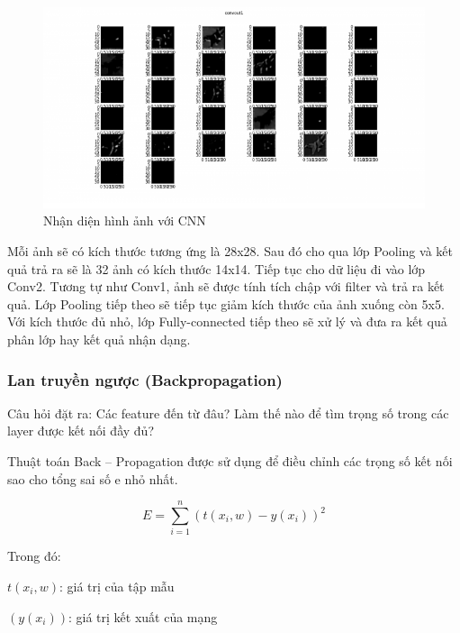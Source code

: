 \begin{center}
    \begin{figure}[h!]
    \begin{center}
     \includegraphics[scale=0.8]{img/basiccnn2.png}
    \end{center}
    \caption{Nhận diện hình ảnh với CNN \cite{ptha} }
    \label{refhinh9}
    \end{figure}
\end{center}

Mỗi ảnh sẽ có kích thước tương ứng là 28x28. Sau đó cho qua lớp Pooling và kết quả trả ra sẽ là 32 ảnh có kích thước 14x14. Tiếp tục cho dữ liệu đi vào lớp Conv2. Tương tự như Conv1, ảnh sẽ được tính tích chập với filter và trả ra kết quả. Lớp Pooling tiếp theo sẽ tiếp tục giảm kích thước của ảnh xuống còn 5x5. Với kích thước đủ nhỏ, lớp Fully-connected tiếp theo sẽ xử lý và đưa ra kết quả phân lớp hay kết quả nhận dạng.

\subsubsection{Lan truyền ngược (Backpropagation)}

Câu hỏi đặt ra: Các feature đến từ đâu? Làm thế nào để tìm trọng số trong các layer được kết nối đầy đủ?

Thuật toán Back – Propagation được sử dụng để điều chỉnh các trọng số kết nối sao cho tổng sai số e nhỏ nhất.

\begin{equation}
E = \sum_{i = 1}^n (t(x_i, w) - y(x_i))^2
\end{equation}

Trong đó:

\qquad $t(x_i, w)$: giá trị của tập mẫu

\qquad $(y(x_i))$: giá trị kết xuất của mạng

